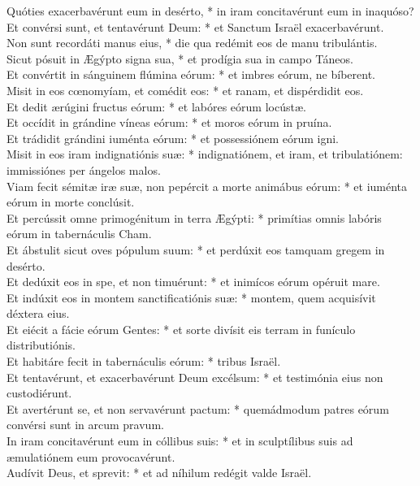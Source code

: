 {	Quóties exacerbavérunt eum in desérto, * in iram concitavérunt eum in inaquóso? \\
	Et convérsi sunt, et tentavérunt Deum: * et Sanctum Israël exacerbavérunt. \\
	Non sunt recordáti manus eius, * die qua redémit eos de manu tribulántis. \\
	Sicut pósuit in Ægýpto signa sua, * et prodígia sua in campo Táneos. \\
	Et convértit in sánguinem flúmina eórum: * et imbres eórum, ne bíberent. \\
	Misit in eos cœnomyíam, et comédit eos: * et ranam, et dispérdidit eos. \\
	Et dedit ærúgini fructus eórum: * et labóres eórum locústæ. \\
	Et occídit in grándine víneas eórum: * et moros eórum in pruína. \\
	Et trádidit grándini iuménta eórum: * et possessiónem eórum igni. \\
	Misit in eos iram indignatiónis suæ: * indignatiónem, et iram, et tribulatiónem: immissiónes per ángelos malos. \\
	Viam fecit sémitæ iræ suæ, non pepércit a morte animábus eórum: * et iuménta eórum in morte conclúsit. \\
	Et percússit omne primogénitum in terra Ægýpti: * primítias omnis labóris eórum in tabernáculis Cham. \\
	Et ábstulit sicut oves pópulum suum: * et perdúxit eos tamquam gregem in desérto. \\
	Et dedúxit eos in spe, et non timuérunt: * et inimícos eórum opéruit mare. \\
	Et indúxit eos in montem sanctificatiónis suæ: * montem, quem acquisívit déxtera eius. \\
	Et eiécit a fácie eórum Gentes: * et sorte divísit eis terram in funículo distributiónis. \\
	Et habitáre fecit in tabernáculis eórum: * tribus Israël. \\
	Et tentavérunt, et exacerbavérunt Deum excélsum: * et testimónia eius non custodiérunt. \\
	Et avertérunt se, et non servavérunt pactum: * quemádmodum patres eórum convérsi sunt in arcum pravum. \\
	In iram concitavérunt eum in cóllibus suis: * et in sculptílibus suis ad æmulatiónem eum provocavérunt. \\
	Audívit Deus, et sprevit: * et ad níhilum redégit valde Israël. \\
}
